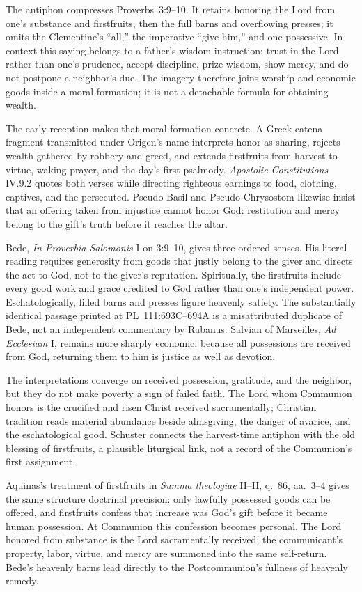 The antiphon compresses Proverbs~3:9--10. It retains honoring the Lord from
one's substance and firstfruits, then the full barns and overflowing presses;
it omits the Clementine's ``all,'' the imperative ``give him,'' and one
possessive. In context this saying belongs to a father's wisdom instruction:
trust in the Lord rather than one's prudence, accept discipline, prize wisdom,
show mercy, and do not postpone a neighbor's due. The imagery therefore joins
worship and economic goods inside a moral formation; it is not a detachable
formula for obtaining wealth.

The early reception makes that moral formation concrete. A Greek catena
fragment transmitted under Origen's name interprets honor as sharing, rejects
wealth gathered by robbery and greed, and extends firstfruits from harvest to
virtue, waking prayer, and the day's first psalmody. \emph{Apostolic
Constitutions} IV.9.2 quotes both verses while directing righteous earnings to
food, clothing, captives, and the persecuted. Pseudo-Basil and
Pseudo-Chrysostom likewise insist that an offering taken from injustice cannot
honor God: restitution and mercy belong to the gift's truth before it reaches
the altar.

Bede, \emph{In Proverbia Salomonis} I on 3:9--10, gives three ordered senses. His
literal reading requires generosity from goods that justly belong to the giver
and directs the act to God, not to the giver's reputation. Spiritually, the firstfruits include
every good work and grace credited to God rather than one's independent
power. Eschatologically, filled barns and presses figure heavenly satiety.
The substantially identical passage printed at PL~111:693C--694A is a
misattributed duplicate of Bede, not an independent commentary by Rabanus.
Salvian of Marseilles,
\emph{Ad Ecclesiam} I, remains more sharply economic: because all possessions
are received from God, returning them to him is justice as well as devotion.

The interpretations converge on received possession, gratitude, and the
neighbor, but they do not make poverty a sign of failed faith. The Lord whom
Communion honors is the crucified and risen Christ received sacramentally;
Christian tradition reads material abundance beside almsgiving, the
danger of avarice, and the eschatological good. Schuster connects the
harvest-time antiphon with the old blessing of firstfruits, a plausible
liturgical link, not a record of the Communion's first assignment.

Aquinas's treatment of firstfruits in \emph{Summa theologiae} II--II,
q.~86, aa.~3--4 gives the same structure doctrinal precision: only lawfully
possessed goods can be offered, and firstfruits confess that increase was God's
gift before it became human possession. At Communion this confession becomes
personal. The Lord honored from substance is the Lord sacramentally received;
the communicant's property, labor, virtue, and mercy are summoned into the same
self-return. Bede's heavenly barns lead directly to the Postcommunion's
fullness of heavenly remedy.

